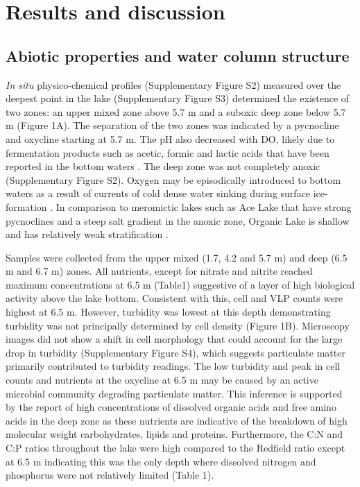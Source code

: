

\section{Results and discussion}

\subsection{Abiotic properties and water column structure}
\emph{In situ} physico-chemical profiles (Supplementary Figure S2) measured over the deepest point in the lake (Supplementary Figure S3) determined the existence of two zones: an upper mixed zone above 5.7 m and a suboxic deep zone below 5.7 m (Figure 1A). 
The separation of the two zones was indicated by a pycnocline and oxycline starting at 5.7 m. 
The pH also decreased with \ac{DO}, likely due to fermentation products such as acetic, formic and lactic acids that have been reported in the bottom waters \cite{Franzmann1987b, Gibson1994}. 
The deep zone was not completely anoxic (Supplementary Figure S2). 
Oxygen may be episodically introduced to bottom waters as a result of currents of cold dense water sinking during surface ice-formation \cite{Ferris1999}. 
In comparison to meromictic lakes such as Ace Lake that have strong pycnoclines and a steep salt gradient in the anoxic zone, Organic Lake is shallow and has relatively weak stratification \cite{Gibson1999}. 

Samples were collected from the upper mixed (1.7, 4.2 and 5.7 m) and deep (6.5 m and 6.7 m) zones. 
All nutrients, except for nitrate and nitrite reached maximum concentrations at 6.5 m (Table1) suggestive of a layer of high biological activity above the lake bottom. 
Consistent with this, cell and \ac{VLP} counts were highest at 6.5 m. 
However, turbidity was lowest at this depth demonstrating turbidity was not principally determined by cell density (Figure 1B). 
Microscopy images did not show a shift in cell morphology that could account for the large drop in turbidity (Supplementary Figure S4), which suggests particulate matter primarily contributed to turbidity readings. 
The low turbidity and peak in cell counts and nutrients at the oxycline at 6.5 m may be caused by an active microbial community degrading particulate matter. 
This inference is supported by the report of high concentrations of dissolved organic acids and free amino acids in the deep zone \cite{Gibson1994} as these nutrients are indicative of the breakdown of high molecular weight carbohydrates, lipids and proteins. 
Furthermore, the C:N and C:P ratios throughout the lake were high compared to the Redfield ratio \cite{Redfield1963} except at 6.5 m indicating this was the only depth where dissolved nitrogen and phosphorus were not relatively limited (Table 1).
 
